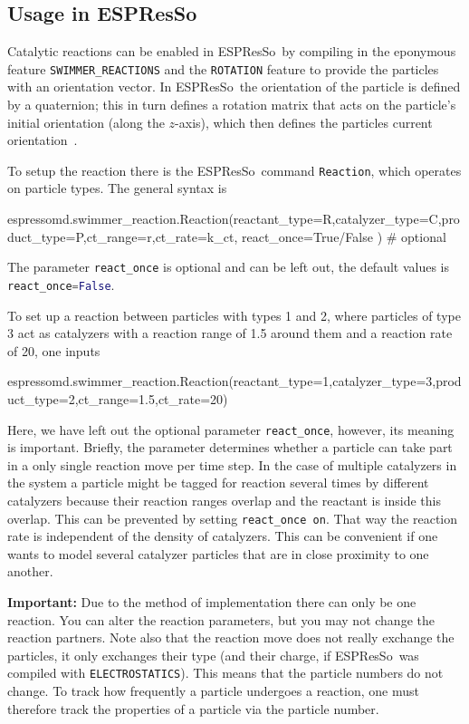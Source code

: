 \documentclass[aip,jcp,reprint,a4paper,onecolumn,nofootinbib,amsmath,amssymb]{revtex4-1}
\newcommand\code{\lstinline}
\newcommand{\es}{\mbox{\textsf{ESPResSo}}\xspace}
\newcommand\codees{\lstinline[language=python]}
\begin{document}
\subsection{Usage in \es}

Catalytic reactions can be enabled in \es\ by compiling in the eponymous feature \code{SWIMMER_REACTIONS} and the \code{ROTATION} feature to provide the particles with an orientation vector. In \es\ the orientation of the particle is defined by a quaternion; this in turn defines a rotation matrix that acts on the particle's initial orientation (along the $z$-axis), which then defines the particles current orientation~\cite{UG,Limbach_06,Arnold_13}.

To setup the reaction there is the \es\ command \codees{Reaction}, which operates on particle types. The general syntax is
\begin{espresso}
espressomd.swimmer_reaction.Reaction(reactant_type=R,catalyzer_type=C,product_type=P,ct_range=r,ct_rate=k_ct,
                                react_once=True/False ) # optional
\end{espresso}
The parameter \codees{react_once} is optional and can be left out, the default values is \codees{react_once=False}.

To set up a reaction between particles with types 1 and 2, where particles of type 3 act as catalyzers with a reaction range of 1.5 around them and a reaction rate of 20, one inputs
\begin{espresso}
espressomd.swimmer_reaction.Reaction(reactant_type=1,catalyzer_type=3,product_type=2,ct_range=1.5,ct_rate=20)
\end{espresso}
Here, we have left out the optional parameter \codees{react_once}, however, its meaning is important. Briefly, the parameter determines whether a particle can take part in a only single reaction move per time step. In the case of multiple catalyzers in the system a particle might be tagged for reaction several times by different catalyzers because their reaction ranges overlap and the reactant is inside this overlap. This can be prevented by setting \code{react_once on}. That way the reaction rate is independent of the density of catalyzers. This can be convenient if one wants to model several catalyzer particles that are in close proximity to one another.

\noindent\textbf{Important:} Due to the method of implementation there can only be one reaction. You can alter the reaction parameters, but you may not change the reaction partners. Note also that the reaction move does not really exchange the particles, it only exchanges their type (and their charge, if \es\ was compiled with \code{ELECTROSTATICS}). This means that the particle numbers do not change. To track how frequently a particle undergoes a reaction, one must therefore track the properties of a particle via the particle number.
\end{document}
